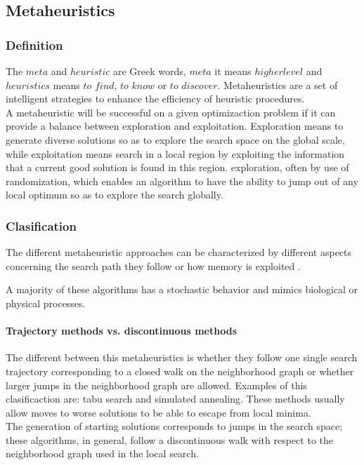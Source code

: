 \subsection{Metaheuristics}

\subsubsection{Definition}
The $meta$ and $heuristic$ are Greek words, $meta$ it means $higher level$ and $heuristics$ means $to$ $find$, $to$ $know$ or $to$ $discover$. Metaheuristics are a set of intelligent strategies to enhance the efficiency of heuristic procedures.\\

A metaheuristic will be successful on a given optimizaction problem if it can provide a balance between exploration and exploitation. Exploration means to generate diverse solutions so as to explore the search space on the global scale, while exploitation means search in a local region by exploiting the information that a current good solution is found in this region.
exploration, often by use of randomization, which enables an algorithm to have the ability to jump out of any local optimum so as to explore the search globally.

\subsubsection{Clasification}
The different metaheuristic approaches can be characterized by different aspects concerning the search path they follow or how memory is exploited \cite{citeulike:1859945}.

A majority of these algorithms has a stochastic behavior and mimics biological or  physical processes.

\paragraph{Trajectory methods vs. discontinuous methods}
The different between this metaheuristics is whether they follow one single search trajectory
corresponding to a closed walk on the neighborhood graph or whether larger
jumps in the neighborhood graph are allowed. Examples of this clasificaction are: tabu search and simulated annealing. These methods usually allow moves to worse solutions to be able to escape from local minima.\\

The generation of starting solutions corresponds to jumps in the search space; these algorithms, in general, follow a discontinuous walk with respect to the neighborhood graph used in the local
search.
